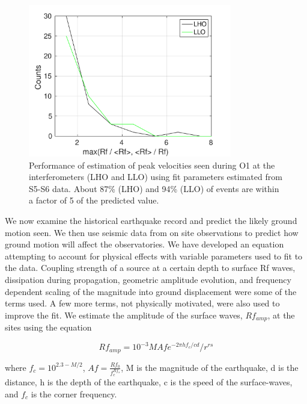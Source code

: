 \documentclass[reprint, prl, aps, showpacs]{revtex4-1}
\begin{document}
\begin{figure}[t]
\hspace*{-0.5cm}
 \includegraphics[width=3.5in]{pred_diff.pdf}
 \caption{Performance of estimation of peak velocities seen during O1 at the interferometers (LHO and LLO) using fit parameters estimated from S5-S6 data. About 87\% (LHO) and 94\% (LLO) of events are within a factor of 5 of the predicted value.}
 \label{fig:regressionperf}
\end{figure}

We now examine the historical earthquake record and predict the likely ground motion seen. We then use seismic data from on site observations to predict how ground motion will affect the observatories. We have developed an equation attempting to account for physical effects with variable parameters used to fit to the data. Coupling strength of a source at a certain depth to surface Rf waves, dissipation during propagation, geometric amplitude evolution, and frequency dependent scaling of the magnitude into ground displacement were some of the terms used. A few more terms, not physically motivated, were also used to improve the fit. We estimate the amplitude of the surface waves, $Rf_{amp}$, at the sites using the equation

\begin{equation}
Rf_{amp} = 10^{-3} M Af e^{-2 \pi h f_c/cd}/r^{rs}
\label{eq:Rfamp}
\end{equation}

where $f_c = 10^{2.3-M/2}$, $Af = \frac{Rf_0}{f_c^{Rf_s}}$, M is the magnitude of the earthquake, d is the distance, h is the depth of the earthquake, c is the speed of the surface-waves, and $f_{c}$ is the corner frequency. 

\end{document}
